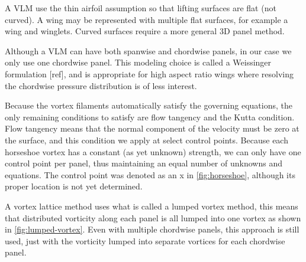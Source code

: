 \documentclass{article}
\begin{document}
A VLM use the thin airfoil assumption so that  lifting surfaces are flat (not curved).  A wing may be represented with multiple flat surfaces, for example a wing and winglets.  Curved surfaces require a more general 3D panel method.

Although a VLM can have both spanwise and chordwise panels, in our case we only use one chordwise panel.  This modeling choice is called a Weissinger formulation [ref], and is appropriate for high aspect ratio wings where resolving the chordwise pressure distribution is of less interest.  



Because the vortex filaments automatically satisfy the governing equations, the only remaining conditions to satisfy are flow tangency and the Kutta condition.  Flow tangency means that the normal component of the velocity must be zero at the surface, and this condition we apply at select control points.  Because each horseshoe vortex has a constant (as yet unknown) strength, we can only have one control point per panel, thus maintaining an equal number of unknowns and equations.  The control point was denoted as an x in \cref{fig:horseshoe}, although its proper location is not yet determined.




A vortex lattice method uses what is called a lumped vortex method, this means that distributed vorticity along each panel is all lumped into one vortex as shown in \cref{fig:lumped-vortex}.  Even with multiple chordwise panels, this approach is still used, just with the vorticity lumped into separate vortices for each chordwise panel.
\end{document}
